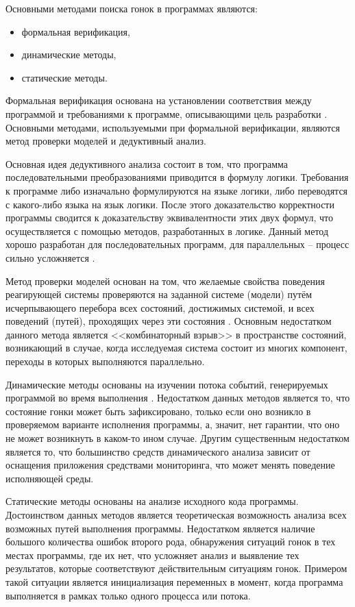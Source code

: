 Основными методами поиска гонок в программах являются:

\begin{itemize}
  \item формальная верификация,
  \item динамические методы,
  \item статические методы.
\end{itemize}

Формальная верификация основана на установлении соответствия между программой и требованиями к программе, описывающими цель разработки \cite{Kropacheva}. Основными методами, используемыми при формальной верификации, являются метод проверки моделей и дедуктивный анализ.

Основная идея дедуктивного анализа состоит в том, что программа  последовательными преобразованиями приводится в формулу логики. Требования к программе либо изначально формулируются на языке логики, либо переводятся с какого-либо языка на язык логики. После этого доказательство корректности программы сводится к доказательству эквивалентности этих двух формул, что осуществляется с помощью методов, разработанных в логике. Данный метод хорошо разработан для последовательных программ, для параллельных – процесс сильно усложняется \cite{Kropacheva}.

Метод проверки моделей основан на том, что желаемые свойства поведения реагирующей системы проверяются на заданной системе (модели) путём исчерпывающего перебора всех состояний, достижимых системой, и всех поведений (путей), проходящих через эти состояния \cite{Peled}. Основным недостатком данного метода является <<комбинаторный взрыв>> в пространстве состояний, возникающий в случае, когда исследуемая система состоит из многих компонент, переходы в которых выполняются параллельно.

Динамические методы основаны на изучении потока событий, генерируемых программой во время выполнения \cite{Kovega}. Недостатком данных методов является то, что состояние гонки может быть зафиксировано, только если оно возникло в проверяемом  варианте исполнения программы, а, значит, нет гарантии, что оно не может возникнуть в каком-то ином случае. Другим существенным недостатком является то, что большинство средств динамического анализа зависит от оснащения приложения средствами мониторинга, что может менять поведение исполняющей среды.

Статические методы основаны на анализе исходного кода программы. Достоинством данных методов является теоретическая возможность анализа всех возможных путей выполнения программы. Недостатком является наличие большого количества ошибок второго рода,  обнаружения ситуаций гонок в тех местах программы, где их нет, что усложняет анализ и выявление тех результатов, которые соответствуют действительным ситуациям гонок. Примером такой ситуации является инициализация переменных в момент, когда программа выполняется в рамках только одного процесса или потока.

